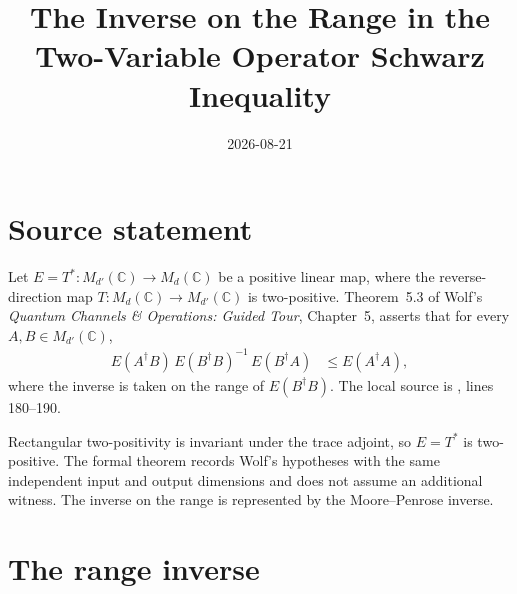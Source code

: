 \documentclass{article}
\title{The Inverse on the Range in the Two-Variable Operator Schwarz Inequality}
\author{}
\date{2026-08-21}
\begin{document}
\maketitle
{}

\section{Source statement}

Let $E=T^*\colon M_{d'}(\mathbb C)\to M_d(\mathbb C)$ be a positive linear
map, where the reverse-direction map
$T\colon M_d(\mathbb C)\to M_{d'}(\mathbb C)$ is two-positive.
Theorem~5.3 of Wolf's \emph{Quantum Channels \& Operations: Guided Tour},
Chapter~5, asserts that for every $A,B\in M_{d'}(\mathbb C)$,
\begin{align}
  E(A^\dagger B)\,E(B^\dagger B)^{-1}\,E(B^\dagger A)
  &\leq E(A^\dagger A),
  \label{eq:schwarz}
\end{align}
where the inverse is taken on the range of $E(B^\dagger B)$.  The local
source is
, lines
180--190.

Rectangular two-positivity is invariant under the trace adjoint, so $E=T^*$
is two-positive. The formal theorem records Wolf's hypotheses with the same
independent input and output dimensions and does not assume an additional
witness. The inverse on the range is represented by the Moore--Penrose inverse.

\section{The range inverse}
\end{document}
